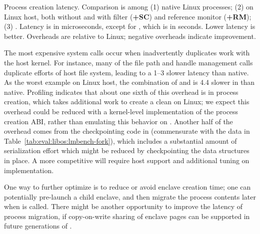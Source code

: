 \label{sec:eval:libos:fork}

\begin{table}[t!b!]

\caption{Process creation latency. Comparison is among (1) native Linux processes; (2) \graphene{} on Linux host, both without and with \seccomp{} filter ({\bf +SC}) and reference monitor ({\bf +RM}); (3) \graphenesgx{}.
Latency is in microseconds, except for \graphenesgx{}, which is in seconds. Lower latency is better.
Overheads are relative to Linux; negative overheads indicate improvement.} 
\label{tab:eval:libos:lmbench-fork}
\end{table}


The most expensive system calls occur when \thelibos{} inadvertently duplicates work
with the host kernel.  
For instance, many of the file path and handle management calls duplicate efforts of host file system,
leading to a 1--3\x{} slower latency than native.
As the worst example on Linux host,
the combination of  and  is 4.4\x{} slower in \graphene{} than native.
Profiling indicates that about one sixth of this overhead is in process creation, which 
takes additional work to create a clean \picoproc{} on Linux; we expect this overhead could be reduced
with a kernel-level implementation of the process creation ABI, rather than emulating this behavior on .
Another half of the overhead comes from the
checkpointing code in \thelibos{} (commensurate with the data in Table~\ref{tab:eval:libos:lmbench-fork}), which 
includes a substantial amount of serialization effort which might be reduced by checkpointing the data structures in place.
A more competitive  will require host support and additional tuning on \thelibos{} implementation.


One way to further optimize  is to reduce or avoid enclave creation time; one can potentially pre-launch a child enclave, and then migrate the process contents later when  is called.
There might be another opportunity to improve the latency of process migration,
if copy-on-write sharing of enclave pages can be supported in future generations of \sgx{}.


